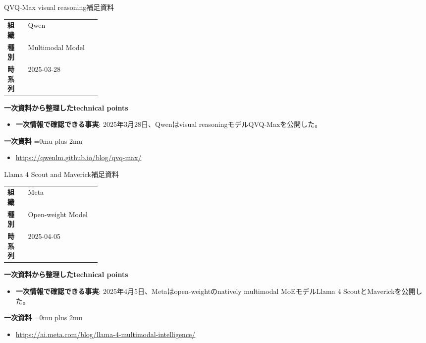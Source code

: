 \begin{technicalnote}{QVQ-Max visual reasoning}{補足資料}
\begingroup
\begin{tabularx}{\linewidth}{@{}>{\bfseries}p{0.22\linewidth}X@{}}
組織 & Qwen \\
種別 & Multimodal Model \\
時系列 & 2025-03-28 \\
\end{tabularx}
\smallskip
{\bfseries 一次資料から整理したtechnical points}
\begin{itemize}[leftmargin=1.5em,itemsep=0.35em]
\item \textbf{一次情報で確認できる事実}: 2025年3月28日、Qwenはvisual reasoningモデルQVQ-Maxを公開した。
\end{itemize}
\begin{samepage}
{\bfseries 一次資料}
\begingroup\sloppy
\Urlmuskip=0mu plus 2mu\relax
\begin{itemize}[leftmargin=1.5em,itemsep=0.25em]
\item {\scriptsize\url{https://qwenlm.github.io/blog/qvq-max/}}
\end{itemize}
\endgroup
\end{samepage}
\endgroup
\end{technicalnote}
\medskip

\begin{technicalnote}{Llama 4 Scout and Maverick}{補足資料}
\begingroup
\begin{tabularx}{\linewidth}{@{}>{\bfseries}p{0.22\linewidth}X@{}}
組織 & Meta \\
種別 & Open-weight Model \\
時系列 & 2025-04-05 \\
\end{tabularx}
\smallskip
{\bfseries 一次資料から整理したtechnical points}
\begin{itemize}[leftmargin=1.5em,itemsep=0.35em]
\item \textbf{一次情報で確認できる事実}: 2025年4月5日、Metaはopen-weightのnatively multimodal MoEモデルLlama 4 ScoutとMaverickを公開した。
\end{itemize}
\begin{samepage}
{\bfseries 一次資料}
\begingroup\sloppy
\Urlmuskip=0mu plus 2mu\relax
\begin{itemize}[leftmargin=1.5em,itemsep=0.25em]
\item {\scriptsize\url{https://ai.meta.com/blog/llama-4-multimodal-intelligence/}}
\end{itemize}
\endgroup
\end{samepage}
\endgroup
\end{technicalnote}
\medskip

